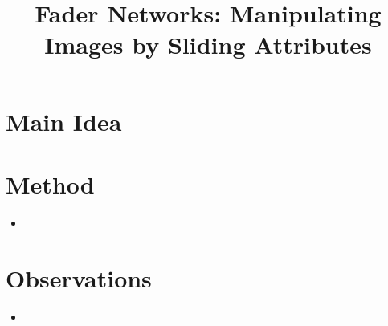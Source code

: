 \documentclass[12pt]{scrartcl}
\begin{document}
    
    \title{Fader Networks: Manipulating Images by Sliding Attributes}
    \author{}
    \date{}
    \maketitle
    
    \section{Main Idea}
    
    \section{Method}
      \begin{itemize}
        \item 
      \end{itemize}
    
    \section{Observations}
      \begin{itemize}
        \item 
      \end{itemize}
    
    
    
    
    
\end{document}
